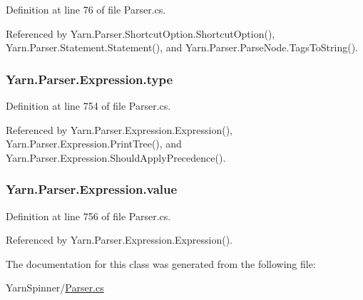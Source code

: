 Definition at line 76 of file Parser.\-cs.



Referenced by Yarn.\-Parser.\-Shortcut\-Option.\-Shortcut\-Option(), Yarn.\-Parser.\-Statement.\-Statement(), and Yarn.\-Parser.\-Parse\-Node.\-Tags\-To\-String().

\hypertarget{a00094_ad55c92df835006328bc2a79a8f91efb9}{
\subsubsection[{type}]{ Yarn.\-Parser.\-Expression.\-type\hspace{0.3cm}{\ttfamily [package]}}}\label{a00094_ad55c92df835006328bc2a79a8f91efb9}


Definition at line 754 of file Parser.\-cs.



Referenced by Yarn.\-Parser.\-Expression.\-Expression(), Yarn.\-Parser.\-Expression.\-Print\-Tree(), and Yarn.\-Parser.\-Expression.\-Should\-Apply\-Precedence().

\hypertarget{a00094_a569e516782891544c334ff8131b23108}{
\subsubsection[{value}]{ Yarn.\-Parser.\-Expression.\-value\hspace{0.3cm}{\ttfamily [package]}}}\label{a00094_a569e516782891544c334ff8131b23108}


Definition at line 756 of file Parser.\-cs.



Referenced by Yarn.\-Parser.\-Expression.\-Expression().



The documentation for this class was generated from the following file\-:\begin{DoxyCompactItemize}
\item 
Yarn\-Spinner/\hyperlink{a00295}{Parser.\-cs}\end{DoxyCompactItemize}
